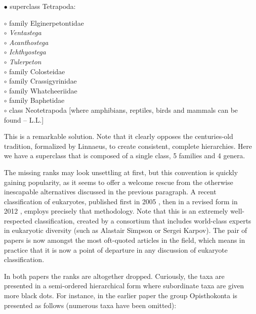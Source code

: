 \begin{artengenv}
\noindent$\bullet$ superclass Tetrapoda:
\begin{addmargin}[1em]{0em}
 $\circ$ family Elginerpetontidae\\
 $\circ$ \textit{Ventastega}\\
 $\circ$ \textit{Acanthostega}\\
 $\circ$ \textit{Ichthyostega}\\
 $\circ$ \textit{Tulerpeton}\\
 $\circ$ family Colosteidae\\
 $\circ$ family Crassigyrinidae\\
 $\circ$ family Whatcheeriidae\\
 $\circ$ family Baphetidae\\
 $\circ$ class Neotetrapoda [where amphibians, reptiles, birds and mammals can be found -- L.L.]
\end{addmargin}

This is a remarkable solution. Note that it clearly opposes the centuries-old tradition, formalized by Linnaeus, to
create consistent, complete hierarchies. Here we have a superclass that is composed of a single class, 5 families and 4
genera.

The missing ranks may look unsettling at first, but this convention is quickly gaining popularity, as it seems to offer
a welcome rescue from the otherwise inescapable alternatives discussed in the previous paragraph. A recent
classification of eukaryotes, published first in 2005
\parencite{adl_new_2005},
then in a revised
form in 2012
\parencite{adl_revised_2012},
employs precisely that methodology. Note that this is an
extremely well-respected classification, created by a consortium that includes world-class experts in eukaryotic
diversity (such as Alastair Simpson or Sergei Karpov). The pair of papers is now amongst the most oft-quoted articles
in the field, which means in practice that it is now a point of departure in any discussion of eukaryote
classification.

In both papers the ranks are altogether dropped. Curiously, the taxa are presented in a semi-ordered hierarchical form
where subordinate taxa are given more black dots. For instance, in the earlier paper
\parencite{adl_new_2005}
the group Opisthokonta is presented as follows (numerous taxa have been omitted):


\end{artengenv}
